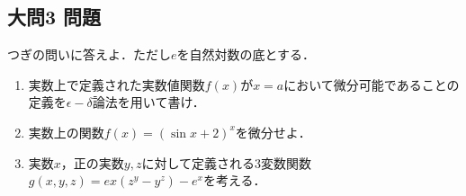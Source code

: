 \documentclass[dvipdfmx]{jsreport}
\begin{document}
\subsection{大問3 問題}
\begin{tcolorbox} %
	つぎの問いに答えよ．ただし$e$を自然対数の底とする．
\begin{enumerate}
	\item 実数上で定義された実数値関数$f(x)$が$x= a$において微分可能であることの定義を$\epsilon- \delta$論法を用いて書け．
	\item 実数上の関数$f(x)= (\sin{x}+ 2)^x$を微分せよ．
	\item 実数$x$，正の実数$y, z$に対して定義される3変数関数$g(x, y, z)= ex(z^y- y^z)- e^x$を考える．
\end{enumerate}
\end{tcolorbox}
\end{document}
